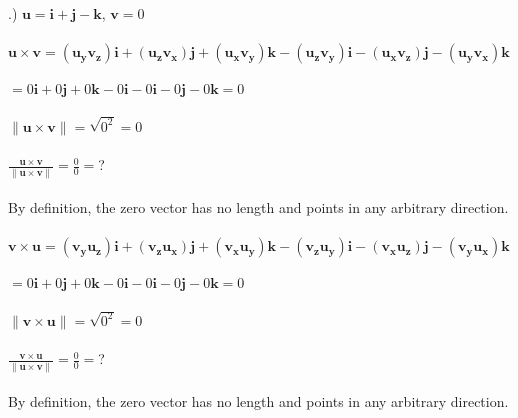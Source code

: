 \documentclass[12pt]{article}
\begin{document}
.) $\mathbf{u} = \mathbf{i} + \mathbf{j} - \mathbf{k}$, \hspace{10pt} $\mathbf{v} = 0$\\\\
\noindent $\mathbf{u \times v } = (\mathbf{u_{y}v_{z}})\mathbf{i} + (\mathbf{u_{z}v_{x}})\mathbf{j} + (\mathbf{u_{x}v_{y}})\mathbf{k} -(\mathbf{u_{z}v_{y}})\mathbf{i} - (\mathbf{u_{x}v_{z}})\mathbf{j}-(\mathbf{u_{y}v_{x}})\mathbf{k}$\\\\
$= 0\mathbf{i} + 0\mathbf{j} + 0\mathbf{k} - 0\mathbf{i} - 0\mathbf{i} - 0\mathbf{j} - 0\mathbf{k} = 0$\\\\
$\| \mathbf{u \times v} \| = \sqrt{0^{2}} = 0$\\\\
$\frac{\mathbf{u \times v}}{\| \mathbf{u \times v} \|} = \frac{0}{0} = $?\\\\
\noindent By definition, the zero vector has no length and points in any arbitrary direction.\\\\
\noindent$\mathbf{v \times u } = (\mathbf{v_{y}u_{z}})\mathbf{i} + (\mathbf{v_{z}u_{x}})\mathbf{j} + (\mathbf{v_{x}u_{y}})\mathbf{k} -(\mathbf{v_{z}u_{y}})\mathbf{i} - (\mathbf{v_{x}u_{z}})\mathbf{j}-(\mathbf{v_{y}u_{x}})\mathbf{k}$\\\\
$= 0\mathbf{i} + 0\mathbf{j} + 0\mathbf{k} - 0\mathbf{i} - 0\mathbf{i} - 0\mathbf{j} - 0\mathbf{k} = 0$\\\\
$\| \mathbf{v \times u} \| = \sqrt{0^{2}} = 0$\\\\
$\frac{\mathbf{v \times u}}{\| \mathbf{u \times v} \|} = \frac{0}{0} = $?\\\\
By definition, the zero vector has no length and points in any arbitrary direction.\\\\
\end{document}
